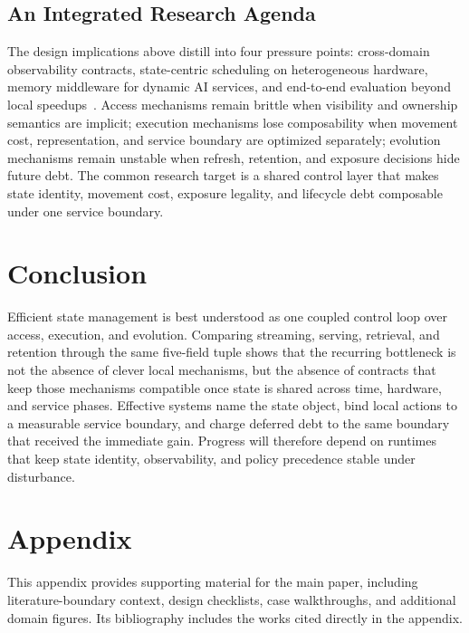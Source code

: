 \documentclass[manuscript]{acmart}
\begin{document}
\subsection{An Integrated Research Agenda}

The design implications above distill into four pressure points: cross-domain observability contracts, state-centric scheduling on heterogeneous hardware, memory middleware for dynamic AI services, and end-to-end evaluation beyond local speedups~\cite{zhang2019briskstream,zhang2020finestream,kwon2023pagedattention,sheng2023flexgen,cong2026mico,zhang2026neuromem,liu2026sage}. Access mechanisms remain brittle when visibility and ownership semantics are implicit; execution mechanisms lose composability when movement cost, representation, and service boundary are optimized separately; evolution mechanisms remain unstable when refresh, retention, and exposure decisions hide future debt. The common research target is a shared control layer that makes state identity, movement cost, exposure legality, and lifecycle debt composable under one service boundary.

\section{Conclusion}
\label{sec:conclusion}

Efficient state management is best understood as one coupled control loop over access, execution, and evolution. Comparing streaming, serving, retrieval, and retention through the same five-field tuple shows that the recurring bottleneck is not the absence of clever local mechanisms, but the absence of contracts that keep those mechanisms compatible once state is shared across time, hardware, and service phases. Effective systems name the state object, bind local actions to a measurable service boundary, and charge deferred debt to the same boundary that received the immediate gain. Progress will therefore depend on runtimes that keep state identity, observability, and policy precedence stable under disturbance.

\clearpage

\appendix
\section*{Appendix}

This appendix provides supporting material for the main paper, including literature-boundary context, design checklists, case walkthroughs, and additional domain figures. Its bibliography includes the works cited directly in the appendix.








\end{document}
